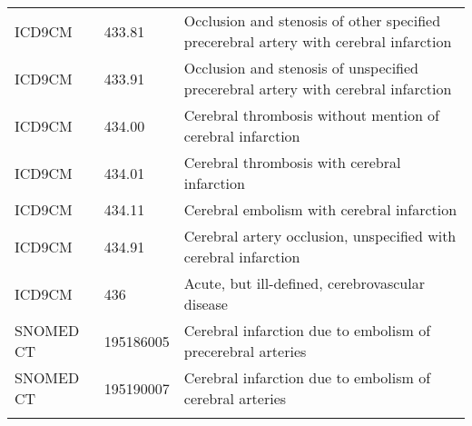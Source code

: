 \begin{longtable}{p{}p{}p{}}
  ICD9CM & 433.81 & Occlusion and stenosis of other specified precerebral artery with cerebral infarction \\ 
  ICD9CM & 433.91 & Occlusion and stenosis of unspecified precerebral artery with cerebral infarction \\ 
  ICD9CM & 434.00 & Cerebral thrombosis without mention of cerebral infarction \\ 
  ICD9CM & 434.01 & Cerebral thrombosis with cerebral infarction \\ 
  ICD9CM & 434.11 & Cerebral embolism with cerebral infarction \\ 
  ICD9CM & 434.91 & Cerebral artery occlusion, unspecified with cerebral infarction \\ 
  ICD9CM & 436 & Acute, but ill-defined, cerebrovascular disease \\ 
  SNOMED CT & 195186005 & Cerebral infarction due to embolism of precerebral arteries \\ 
  SNOMED CT & 195190007 & Cerebral infarction due to embolism of cerebral arteries \\ 
  \hline
\label{tab:codes_ischemic-stroke}
\end{longtable}
